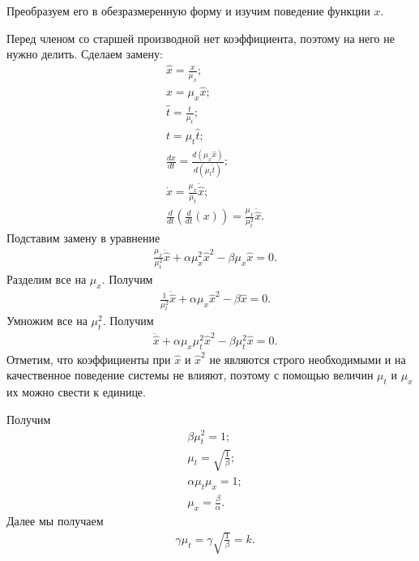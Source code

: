 \documentclass[14pt]{extarticle}
\begin{document}
Преобразуем его в обезразмеренную форму и изучим поведение функции $x$.

Перед членом со старшей производной нет коэффициента, поэтому на него не нужно делить. Сделаем замену:
\begin{equation}
  \begin{aligned}
    &\hat{x} = \frac{x}{\mu_x};\\
    &x=\mu_x\hat{x};\\
    &\hat{t} = \frac{t}{\mu_t};\\
    &t=\mu_t\hat{t};\\
    &\frac{dx}{dt}=\frac{d(\mu_x\hat{x})}{d(\mu_t\hat{t})};\\
    &\dot{x} = \frac{\mu_x}{\mu_t}\dot{\hat{x}};\\
    &\frac{d}{dt}\left(\frac{d}{dt}(x)\right)=\frac{\mu_x}{\mu_t^2}\ddot{\hat{x}}.
  \end{aligned}
\end{equation}
Подставим замену в уравнение
\begin{equation}
  \begin{aligned}
    &\frac{\mu_x}{\mu_t^2}\ddot{\hat{x}} +\alpha\mu_x^2\hat{x}^2 - \beta\mu_x\hat{x}=0.
  \end{aligned}
\end{equation}
Разделим все на $\mu_x$.
Получим
\begin{equation}
  \begin{aligned}
    &\frac{1}{\mu_t^2}\ddot{\hat{x}} +\alpha\mu_x\hat{x}^2 - \beta\hat{x}=0.
  \end{aligned}
\end{equation}
Умножим все на $\mu_t^2$.
Получим
\begin{equation}
  \begin{aligned}
    &\ddot{\hat{x}} +\alpha\mu_x\mu_t^2\hat{x}^2 - \beta\mu_t^2\hat{x}=0.
  \end{aligned}
\end{equation}
Отметим, что коэффициенты при $\hat{x}$ и $\hat{x}^2$ не являются строго необходимыми и на качественное поведение системы не влияют, поэтому с помощью величин $\mu_t$ и $\mu_x$ их можно свести к единице.

Получим
\begin{equation}
  \begin{aligned}
    &\beta\mu_t^2=1;\\
    &\mu_t = \sqrt{\frac{1}{\beta}};\\
    &\alpha\mu_t\mu_x=1;\\
    &\mu_x=\frac{\beta}{\alpha}.
  \end{aligned}
\end{equation}
Далее мы получаем
\begin{equation}
  \begin{aligned}
    &\gamma\mu_t=\gamma\sqrt{\frac{1}{\beta}}=k.
  \end{aligned}
\end{equation}
\end{document}
